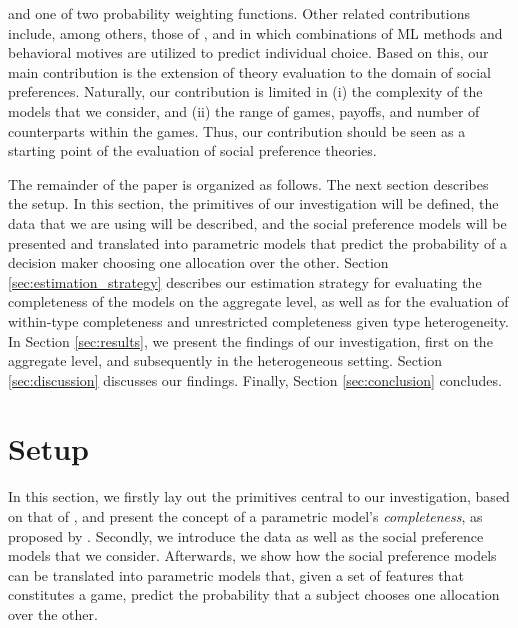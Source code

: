 \documentclass[11pt,a4paper]{article}
\theoremstyle{definition}
\begin{document}
and one of two probability weighting functions. Other related contributions include, among others, those of \cite{Noti2016}, \cite{Plonsky2017} and \cite{Plonsky2019} in which combinations of ML methods and behavioral motives are utilized to predict individual choice.  Based on this, our main contribution is the extension of theory evaluation to the domain of social preferences.  Naturally, our contribution is limited in (i) the complexity of the models that we consider, and (ii) the range of games, payoffs, and number of counterparts within the games. Thus, our contribution should be seen as a starting point of the evaluation of social preference theories.

The remainder of the paper is organized as follows. The next section describes the setup.  In this section, the primitives of our investigation will be defined, the data that we are using will be described, and the social preference models will be presented and translated into parametric models that predict the probability of a decision maker choosing one allocation over the other. Section \ref{sec:estimation_strategy} describes our estimation strategy for evaluating the completeness of the models on the aggregate level, as well as for the evaluation of within-type completeness and unrestricted completeness given type heterogeneity. In Section \ref{sec:results}, we present the findings of our investigation, first on the aggregate level, and subsequently in the heterogeneous setting. Section \ref{sec:discussion} discusses our findings. Finally, Section \ref{sec:conclusion} concludes.

\section{Setup}
\label{sec:setup}
In this section, we firstly lay out the primitives central to our investigation, based on that of \citet{Fudenberg2021a}, and present the concept of a parametric model's \emph{completeness},  as proposed by \citet{Fudenberg2021b}. Secondly, we introduce the data as well as the social preference models that we consider. Afterwards, we show how the social preference models can be translated into parametric models that, given a set of features that constitutes a game, predict the probability that a subject chooses one allocation over the other.
\end{document}
